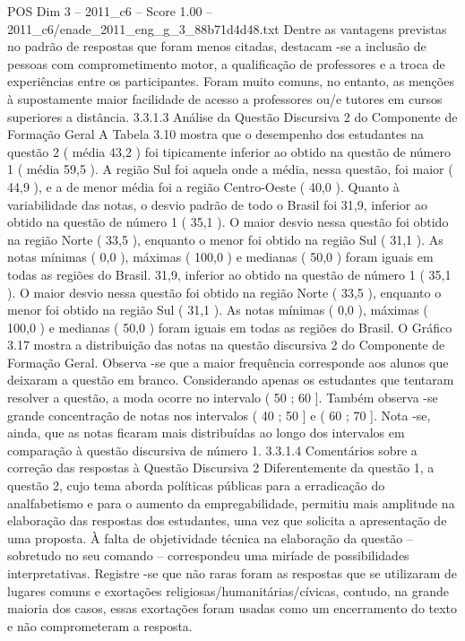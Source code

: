 \begin{textsample}{POS Dim 3 – 2011\_c6 – Score 1.00 – 2011\_c6/enade\_2011\_eng\_g\_3\_88b71d4d48.txt}
Dentre as vantagens previstas no padrão de respostas que foram menos citadas, destacam -se a inclusão de pessoas com comprometimento motor, a qualificação de professores e a troca de experiências entre os participantes.
Foram muito comuns, no entanto, as menções à supostamente maior facilidade de acesso a professores ou/e tutores em cursos superiores a distância. 3.3.1.3 Análise da Questão Discursiva 2 do Componente de Formação Geral A Tabela 3.10 mostra que o desempenho dos estudantes na questão 2 ( média 43,2 ) foi tipicamente inferior ao obtido na questão de número 1 ( média 59,5 ).
A região Sul foi aquela onde a média, nessa questão, foi maior ( 44,9 ), e a de menor média foi a região Centro-Oeste ( 40,0 ).
Quanto à variabilidade das notas, o desvio padrão de todo o Brasil foi 31,9, inferior ao obtido na questão de número 1 ( 35,1 ).
O maior desvio nessa questão foi obtido na região Norte ( 33,5 ), enquanto o menor foi obtido na região Sul ( 31,1 ).
As notas mínimas ( 0,0 ), máximas ( 100,0 ) e medianas ( 50,0 ) foram iguais em todas as regiões do Brasil. 31,9, inferior ao obtido na questão de número 1 ( 35,1 ).
O maior desvio nessa questão foi obtido na região Norte ( 33,5 ), enquanto o menor foi obtido na região Sul ( 31,1 ).
As notas mínimas ( 0,0 ), máximas ( 100,0 ) e medianas ( 50,0 ) foram iguais em todas as regiões do Brasil.
O Gráfico 3.17 mostra a distribuição das notas na questão discursiva 2 do Componente de Formação Geral.
Observa -se que a maior frequência corresponde aos alunos que deixaram a questão em branco.
Considerando apenas os estudantes que tentaram resolver a questão, a moda ocorre no intervalo ( 50 ; 60 ].
Também observa -se grande concentração de notas nos intervalos ( 40 ; 50 ] e ( 60 ; 70 ].
Nota -se, ainda, que as notas ficaram mais distribuídas ao longo dos intervalos em comparação à questão discursiva de número 1. 3.3.1.4 Comentários sobre a correção das respostas à Questão Discursiva 2 Diferentemente da questão 1, a questão 2, cujo tema aborda políticas públicas para a erradicação do analfabetismo e para o aumento da empregabilidade, permitiu mais amplitude na elaboração das respostas dos estudantes, uma vez que solicita a apresentação de uma proposta.
À falta de objetividade técnica na elaboração da questão – sobretudo no seu comando – correspondeu uma miríade de possibilidades interpretativas.
Registre -se que não raras foram as respostas que se utilizaram de lugares comuns e exortações religiosas/humanitárias/cívicas, contudo, na grande maioria dos casos, essas exortações foram usadas como um encerramento do texto e não comprometeram a resposta.

\end{textsample}

